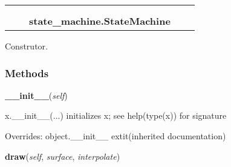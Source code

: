     \label{state_machine:StateMachine}
\begin{tabular}{cccccc}
\multicolumn{2}{r}{\settowidth{\BCL}{object}\multirow{2}{\BCL}{object}}
&&
  \\\cline{3-3}
  &&\multicolumn{1}{c|}{}
&&
  \\
&&\multicolumn{2}{l}{\textbf{state\_machine.StateMachine}}
\end{tabular}

Construtor.



  \subsubsection{Methods}

    \vspace{0.5ex}

\hspace{.8\funcindent}\begin{boxedminipage}{\funcwidth}

    \raggedright \textbf{\_\_init\_\_}(\textit{self})

\setlength{\parskip}{2ex}
    x.\_\_init\_\_(...) initializes x; see help(type(x)) for signature

\setlength{\parskip}{1ex}
      Overrides: object.\_\_init\_\_ 	extit{(inherited documentation)}

    \end{boxedminipage}

    \label{state_machine:StateMachine:draw}

    \vspace{0.5ex}

\hspace{.8\funcindent}\begin{boxedminipage}{\funcwidth}

    \raggedright \textbf{draw}(\textit{self}, \textit{surface}, \textit{interpolate})

\setlength{\parskip}{2ex}
\setlength{\parskip}{1ex}
    \end{boxedminipage}

    \label{state_machine:StateMachine:flip_state}

